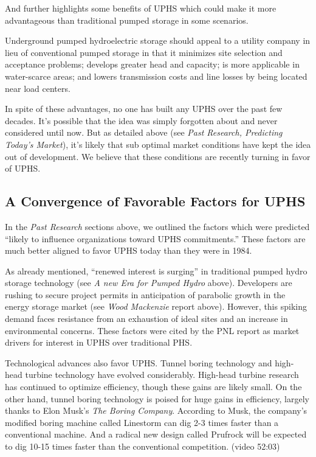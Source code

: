 \documentclass[hidelinks,12pt,a4paper]{article}
\begin{document}
And further highlights some benefits of UPHS which could make it more advantageous than traditional pumped storage in some scenarios.

\begin{displayquote}
Underground pumped hydroelectric storage should appeal to a utility company in lieu of conventional pumped storage in that it minimizes site selection and acceptance problems; develops greater head and capacity; is more applicable in water-scarce areas; and lowers transmission costs and line losses by being located near load centers. \cite{UndergroundPumpedHydroelectricStorage}
\end{displayquote}


In spite of these advantages, no one has built any UPHS over the past few decades. It's possible that the idea was simply forgotten about and never considered until now. But as detailed above (see \textit{Past Research, Predicting Today's Market}), it's likely that sub optimal market conditions have kept the idea out of development. We believe that these conditions are recently turning in favor of UPHS.

\subsection{A Convergence of Favorable Factors for UPHS}
In the \textit{Past Research} sections above, we outlined the factors which were predicted “likely to influence organizations toward UPHS commitments.” These factors are much better aligned to favor UPHS today than they were in 1984.

As already mentioned, “renewed interest is surging” in traditional pumped hydro storage technology (see \textit{A new Era for Pumped Hydro} above). Developers are rushing to secure project permits in anticipation of parabolic growth in the energy storage market (see \textit{Wood Mackenzie} report above). However, this spiking demand faces resistance from an exhaustion of ideal sites and an increase in environmental concerns. These factors were cited by the PNL report as market drivers for interest in UPHS over traditional PHS.

Technological advances also favor UPHS. Tunnel boring technology and high-head turbine technology have evolved considerably. High-head turbine research has continued to optimize efficiency, though these gains are likely small. On the other hand, tunnel boring technology is poised for huge gains in efficiency, largely thanks to Elon Musk's \textit{The Boring Company}. According to Musk, the company's modified boring machine called Linestorm can dig 2-3 times faster than a conventional machine. And a radical new design called Prufrock will be expected to dig 10-15 times faster than the conventional competition.  \cite{TheBoringCompanyInformationSession} (video 52:03)
\end{document}
